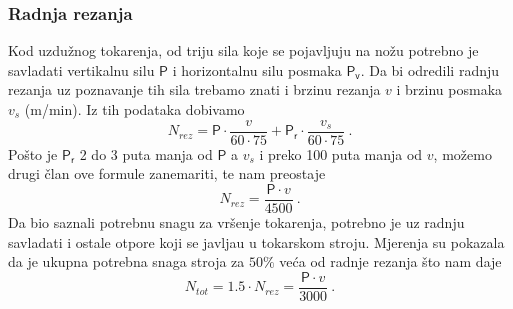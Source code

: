 \documentclass[a4paper,12pt]{article}
\numberwithin{figure}{section}
\begin{document}
\subsubsection{Radnja rezanja}
Kod uzdužnog tokarenja, od triju sila koje se pojavljuju na nožu potrebno je savladati vertikalnu silu $\mathsf{P}$ i horizontalnu silu posmaka $\mathsf{P_{v}}$. Da bi odredili radnju rezanja uz poznavanje tih sila trebamo znati i brzinu rezanja $v$ i brzinu posmaka $v_{s}$ (m/min). Iz tih podataka dobivamo
\begin{equation}
N_{rez} = \mathsf{P} \cdot \frac{v}{60 \cdot 75} + \mathsf{P_{r}} \cdot \frac{v_{s}}{60 \cdot 75}\:.
\end{equation}
Pošto je $\mathsf{P_{r}}$ 2 do 3 puta manja od $\mathsf{P}$ a $v_{s}$ i preko 100 puta manja od $v$, možemo drugi član ove formule zanemariti, te nam preostaje
\begin{equation}
N_{rez} = \frac{\mathsf{P} \cdot v}{4500}\:.
\end{equation}
Da bio saznali potrebnu snagu za vršenje tokarenja, potrebno je uz radnju savladati i ostale otpore koji se javljau u tokarskom stroju. Mjerenja su pokazala da je ukupna potrebna snaga stroja za $50\%$ veća od radnje rezanja što nam daje 
\begin{equation}
N_{tot} =1.5 \cdot N_{rez} = \frac{\mathsf{P} \cdot v}{3000}\:.
\end{equation}
\end{document}
